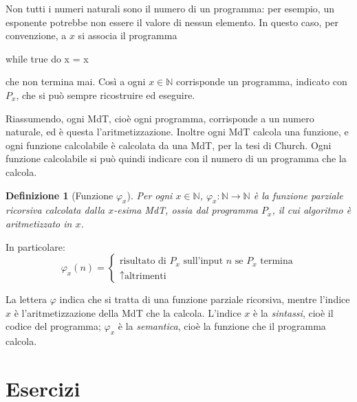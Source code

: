 \documentclass[a4paper, 11pt, oneside]{book}
\theoremstyle{formale}
\newtheorem*{definition}{Definizione}
\begin{document}
    Non tutti i numeri naturali sono il numero di un programma: per esempio, un
    esponente potrebbe non essere il valore di nessun elemento. In questo caso, per
    convenzione, a $x$ si associa il programma
\begin{codice}
while true do x = x
\end{codice}
    \noindent che non termina mai. Cos\`i a ogni $x \in \mathbb{N}$ corrisponde un programma,
    indicato con $P_x$, che si pu\`o sempre ricostruire ed eseguire.

    Riassumendo, ogni MdT, cio\`e ogni programma, corrisponde a un numero naturale, ed \`e
    questa l'aritmetizzazione. Inoltre ogni MdT calcola una funzione, e ogni funzione
    calcolabile \`e calcolata da una MdT, per la tesi di Church. Ogni funzione
    calcolabile si pu\`o quindi indicare con il numero di un programma che la calcola.

    \begin{definition}[Funzione $\varphi_x$]
        Per ogni $x \in \mathbb{N}$, $\varphi_x: \mathbb{N} \to \mathbb{N}$ \`e la funzione 
        parziale ricorsiva calcolata dalla $x$-esima MdT, ossia dal programma $P_x$, il cui
        algoritmo \`e aritmetizzato in $x$.
    \end{definition}

    In particolare: 
    \[
        \varphi_x(n) =
        \begin{cases}
            \text{risultato di } P_x \text{ sull'input } n \text{ se } P_x \text{ termina}\\
            \uparrow  \text{altrimenti}
        \end{cases}
    \]

    La lettera $\varphi$ indica che si tratta di una funzione parziale ricorsiva, mentre
    l'indice $x$ \`e l'aritmetizzazione della MdT che la calcola. L'indice $x$ \`e la
    \emph{sintassi}, cio\`e il codice del programma; $\varphi_x$ \`e la \emph{semantica},
    cio\`e la funzione che il programma calcola. 

    \chapter{Esercizi}
\end{document}
